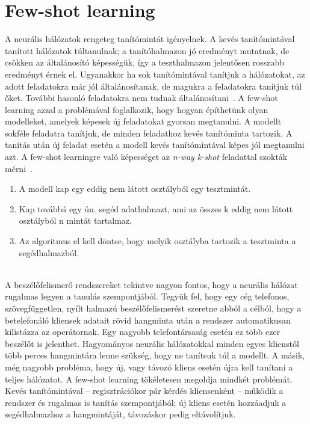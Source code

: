 \section{Few-shot learning} \label{section:few_shot_learning}

A neurális hálózatok rengeteg
tanítómintát igényelnek. A kevés tanítómintával
tanított hálózatok túltanulnak; a tanítóhalmazon jó eredményt mutatnak, de csökken az általánosító képességük, így a teszthalmazon jelentősen rosszabb eredményt érnek el. Ugyanakkor ha sok tanítómintával tanítjuk a hálózatokat, az adott feladatokra már jól általánosítanak, de magukra a feladatokra tanítjuk túl őket. További hasonló feladatokra nem tudnak általánosítani~\cite{RL_meta_learning}.
\newline
\newline
A few-shot learning azzal a problémával foglalkozik, hogy hogyan építhetünk olyan modelleket, amelyek képesek új feladatokat gyorsan megtanulni. A
modellt sokféle feladatra tanítjuk, de minden feladathoz kevés tanítóminta tartozik. A tanítás után új feladat esetén a modell kevés tanítómintával képes jól megtanulni azt. 
\newline
\newline
A few-shot learningre való képességet az \emph{n-way k-shot} feladattal szokták mérni~\cite{voicemap_medium}. 

\begin{enumerate}
	\item A modell kap egy eddig nem látott osztályból egy tesztmintát.
	\item Kap továbbá egy ún. segéd adathalmazt, ami az összes k eddig nem látott osztályból n mintát tartalmaz.
	\item Az algoritmus el kell döntse, hogy melyik osztályba tartozik a tesztminta a segédhalmazból.
\end{enumerate}
\ \\
A beszélőfelismerő rendszereket tekintve nagyon fontos, hogy a neurális hálózat rugalmas legyen a tanulás szempontjából. Tegyük fel, hogy egy cég telefonos, szövegfüggetlen,
nyílt halmazú beszélőfelismerést szeretne abból a célból, hogy a betelefonáló kliensek adatait rövid hangminta után a rendszer automatikusan kilistázza az operátornak.
Egy nagyobb telefontársaság esetén ez több ezer beszélőt is jelenthet. Hagyományos neurális hálózatokkal minden egyes klienstől több perces hangmintára lenne szükség,
hogy ne tanítsuk túl a modellt. 
\newline
\newline
A másik, még nagyobb probléma, hogy új, vagy távozó kliens esetén újra kell tanítani a teljes hálózatot. A few-shot learning tökéletesen
megoldja mindkét problémát. Kevés tanítómintával -- regisztrációkor pár kérdés kliensenként -- működik a rendszer és rugalmas is tanítás szempontjából; új kliens esetén
hozzáadjuk a segédhalmazhoz a hangmintáját, távozáskor pedig eltávolítjuk.

